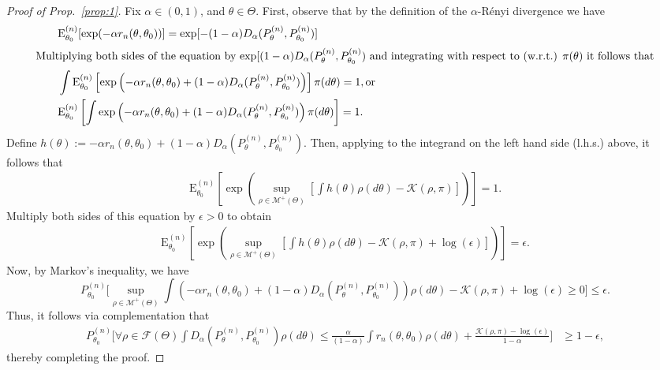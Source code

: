 \documentclass[11pt]{amsart}
\newcommand{\E}{\mathrm{E}}
\newcommand{\loglik}{r_n(\theta,\theta_0)}
\newcommand{\malpharen}{D_{\alpha}(P^{(n)}_{\theta},P^{(n)}_{\theta_0})}
\begin{document}
\begin{proof}[Proof of Prop.~\ref{prop:1}]
Fix $\alpha\in (0,1)$, and $\theta\in\Theta$. First, observe that by the definition of the $\alpha$-R\'enyi divergence we have
\begin{align*}
     & \E^{(n)}_{\theta_0} [\exp (-\alpha \loglik)] = \exp[-(1-\alpha)\malpharen]\\
\intertext{Multiplying both sides of the equation by $\exp[(1-\alpha)\malpharen$ and integrating with respect to (w.r.t.) $\pi(\theta)$ it follows that}
     & \int \E^{(n)}_{\theta_0} \left[\exp \left(-\alpha \loglik+(1-\alpha)\malpharen \right) \right]\pi(d\theta)  = 1,
    \text{or}\\\qquad
     &  \E^{(n)}_{\theta_0}\left[\int \exp \left(-\alpha \loglik+(1-\alpha)\malpharen \right)\pi(d\theta) \right] = 1.
\end{align*}
%
Define $h(\theta) := -\alpha \loglik+(1-\alpha)\malpharen$. Then, applying  to the integrand on the left hand side (l.h.s.) above, it follows that
%
\begin{align*}
    \E^{(n)}_{\theta_0}\left[\exp\left( \underset{\rho\in\mathcal{M}^{+}(\Theta)}{\sup} \left[ \int h(\theta) \rho(d\theta)-\mathcal{K}(\rho,\pi) \right] \right)\right] = 1.
\end{align*}
Multiply both sides of this equation by $\epsilon > 0$ to obtain
\begin{align*}
 \E^{(n)}_{\theta_0}\left[\exp\left( \underset{\rho\in\mathcal{M}^{+}(\Theta)}{\sup} \left[ \int h(\theta) \rho(d\theta)-\mathcal{K}(\rho,\pi) + \log(\epsilon)\right] \right)\right] = \epsilon.
\end{align*}
Now, by Markov's inequality, we have
\begin{equation}
     {P^{(n)}_{\theta_0}}\bigg[ \underset{\rho\in\mathcal{M}^{+}(\Theta)}{\sup} \int(-\alpha \loglik+(1-\alpha)\malpharen)\rho(d\theta)-\mathcal{K}(\rho,\pi) + \log(\epsilon) \geq 0\bigg]\leq\epsilon.
\end{equation}
Thus, it follows via complementation that 
\begin{align*}
   {P^{(n)}_{\theta_0}}\bigg[ \forall \rho\in\mathcal{F}(\Theta) \int\malpharen\rho(d\theta)\leq\frac{\alpha}{(1-\alpha)} \int\loglik\rho(d\theta)+\frac{\mathcal{K}(\rho,\pi) - \log(\epsilon)}{1-\alpha} \bigg] & \geq 1-\epsilon,
\end{align*}
thereby completing the proof.
\end{proof}
\end{document}
